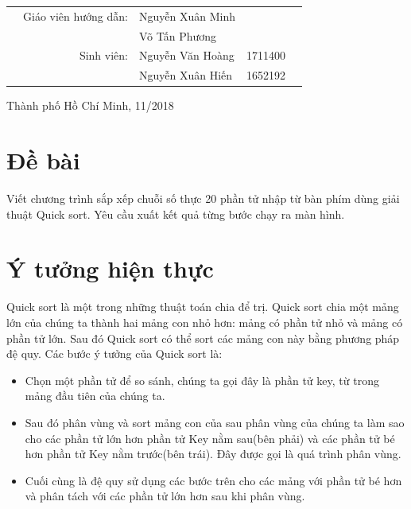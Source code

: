 \documentclass[a4paper]{article}
\begin{document}
\begin{titlepage}
		
		
		\begin{table}[h]
			\begin{tabular}{rrlrr}
				\hspace{3cm}
				& {\large Giáo viên hướng dẫn}: & {\large Nguyễn Xuân Minh}   &         & \\
				& {}							& {\large Võ Tấn Phương}   &         & \\
				& {\large Sinh viên}:           & {\large Nguyễn Văn Hoàng} & 1711400 & \\
				& {}                            & {\large Nguyễn Xuân Hiến } & 1652192 & \\
			\end{tabular}
		\end{table}
		
		\vspace{2cm}
		
		\begin{center}
			{\footnotesize Thành phố Hồ Chí Minh, 11/2018}
		\end{center}
		
	\end{titlepage}

\newpage
\thispagestyle{empty}
\tableofcontents

\newpage

\section{Đề bài}
Viết chương trình sắp xếp chuỗi số thực 20 phần tử nhập từ bàn phím dùng giải thuật Quick sort. Yêu cầu xuất kết quả từng bước chạy ra màn hình.
\section{Ý tưởng hiện thực}
Quick sort là một trong những thuật toán chia để trị. Quick sort chia một mảng lớn của chúng ta thành hai mảng con nhỏ hơn: mảng có phần tử nhỏ và mảng có phần tử lớn. Sau đó Quick sort có thể sort các mảng con này bằng phương pháp đệ quy. Các bước ý tưởng của Quick sort là:
\begin{itemize}
	\item Chọn một phần tử để so sánh, chúng ta gọi đây là phần tử key, từ trong mảng đầu tiên của chúng ta.
	\item Sau đó phân vùng và sort mảng con của sau phân vùng của chúng ta làm sao cho các phần tử lớn hơn phần tử Key nằm sau(bên phải) và các phần tử bé hơn phần tử Key nằm trước(bên trái). Đây được gọi là quá trình phân vùng.
	\item Cuối cùng là đệ quy sử dụng các bước trên cho các mảng với phần tử bé hơn và phân tách với các phần tử lớn hơn sau khi phân vùng.
\end{itemize}
\end{document}
